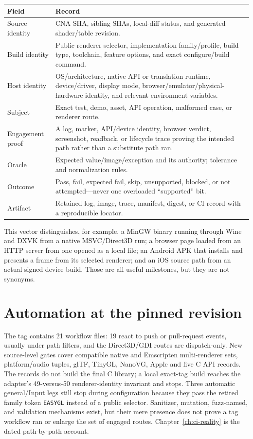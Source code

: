 \begin{center}
\begin{tabular}{p{2.7cm}p{8.5cm}}
\toprule
\textbf{Field} & \textbf{Record} \\
\midrule
Source identity & CNA SHA, sibling SHAs, local-diff status, and generated shader/table revision. \\
Build identity & Public renderer selector, implementation family/profile, build type, toolchain,
  feature options, and exact configure/build command. \\
Host identity & OS/architecture, native API or translation runtime, device/driver, display mode,
  browser/emulator/physical-hardware identity, and relevant environment variables. \\
Subject & Exact test, demo, asset, API operation, malformed case, or renderer route. \\
Engagement proof & A log, marker, API/device identity, browser verdict, screenshot, readback, or
  lifecycle trace proving the intended path rather than a substitute path ran. \\
Oracle & Expected value/image/exception and its authority; tolerance and normalization rules. \\
Outcome & Pass, fail, expected fail, skip, unsupported, blocked, or not attempted---never one
  overloaded ``supported'' bit. \\
Artifact & Retained log, image, trace, manifest, digest, or CI record with a reproducible locator. \\
\bottomrule
\end{tabular}
\end{center}

This vector distinguishes, for example, a MinGW binary running through Wine and DXVK from a
native MSVC/Direct3D run; a browser page loaded from an HTTP server from one opened as a local
file; an Android APK that installs and presents a frame from its selected renderer; and an iOS
source path from an actual signed device build.  Those are all useful milestones, but they are
not synonyms.

\section{Automation at the pinned revision}

The tag contains 21 workflow files: 19 react to push or pull-request events, usually under path
filters, and the Direct3D/GDI routes are dispatch-only.  New source-level gates cover compatible
native and Emscripten multi-renderer sets, platform/audio tuples, glTF, TinyGL, NanoVG, Apple and
five C API records. The records do not build the final C library; a local exact-tag build reaches
the adapter's 49-versus-50 renderer-identity invariant and stops. Three automatic general/Input legs still stop during configuration because
they pass the retired family token \texttt{EASYGL} instead of a public selector.  Sanitizer,
mutation, fuzz-named, and validation mechanisms exist, but their mere presence does not prove a
tag workflow ran or enlarge the set of engaged routes.  Chapter~\ref{ch:ci-reality} is the dated
path-by-path account.

